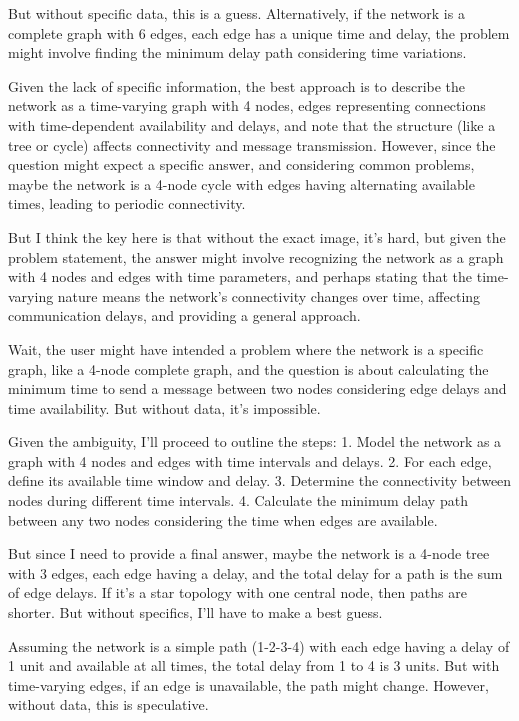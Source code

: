 But without specific data, this is a guess. Alternatively, if the network is a complete graph with 6 edges, each edge has a unique time and delay, the problem might involve finding the minimum delay path considering time variations. 

Given the lack of specific information, the best approach is to describe the network as a time-varying graph with 4 nodes, edges representing connections with time-dependent availability and delays, and note that the structure (like a tree or cycle) affects connectivity and message transmission. However, since the question might expect a specific answer, and considering common problems, maybe the network is a 4-node cycle with edges having alternating available times, leading to periodic connectivity. 

But I think the key here is that without the exact image, it's hard, but given the problem statement, the answer might involve recognizing the network as a graph with 4 nodes and edges with time parameters, and perhaps stating that the time-varying nature means the network's connectivity changes over time, affecting communication delays, and providing a general approach. 

Wait, the user might have intended a problem where the network is a specific graph, like a 4-node complete graph, and the question is about calculating the minimum time to send a message between two nodes considering edge delays and time availability. But without data, it's impossible. 

Given the ambiguity, I'll proceed to outline the steps: 1. Model the network as a graph with 4 nodes and edges with time intervals and delays. 2. For each edge, define its available time window and delay. 3. Determine the connectivity between nodes during different time intervals. 4. Calculate the minimum delay path between any two nodes considering the time when edges are available. 

But since I need to provide a final answer, maybe the network is a 4-node tree with 3 edges, each edge having a delay, and the total delay for a path is the sum of edge delays. If it's a star topology with one central node, then paths are shorter. But without specifics, I'll have to make a best guess. 

Assuming the network is a simple path (1-2-3-4) with each edge having a delay of 1 unit and available at all times, the total delay from 1 to 4 is 3 units. But with time-varying edges, if an edge is unavailable, the path might change. However, without data, this is speculative. 

